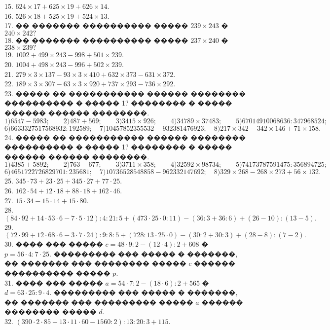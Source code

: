\documentclass[12pt]{article}
\begin{document}
15. $624\times17+625\times 19+626\times14.$\\
16. $526\times18+525\times19+524\times13.$\\
17. �� ������� ���������� ����� $239\times243$ � $240\times242?$\\
18. �� ������� ���������� ����� $237\times240$ � $238\times239?$\\
19. $1002+499\times243-998+501\times239.$\\
20. $1004+498\times243-996+502\times239.$\\
21. $279\times3\times137-93\times3\times410+632\times373-631\times372.$\\
22. $189\times3\times307-63\times3\times920+737\times293-736\times292.$\\
23. ����� �� ����������� ������ �������� ���������� � ����� 1? �������� � ����� ������ ������ ��������.\\
$1)6547-5983;\qquad 2)487+569;\qquad 3)3415\times926;\qquad 4)34789\times37483;\qquad5) 67014910068636:347968524;$
$6)6633327517568932:192589;\quad7)10457852355532-932381476923;\quad8)217\times342-342\times146+71\times158.$\\
24. ����� �� ����������� ������ �������� ���������� � ����� 1? �������� � ����� ������ ������ ��������.\\
$1)4385+5892;\qquad 2)763-677;\qquad 3)3711\times358;\qquad4)32592\times98734;\qquad5) 74173787591475:356894725;$
$6)4651722726829701:235681;\quad7)10736528548858-962332147692;\quad8)329\times268-268\times273+56\times132.$\\
25. $345\cdot73 + 23\cdot25 + 345\cdot27 + 77\cdot25.$\\
26. $162\cdot54+12\cdot18 + 88\cdot18+ 162\cdot46.$\\
27. $15\cdot34-15\cdot14+15\cdot80.$\\
28. $(84\cdot92+14\cdot53\cdot6-7\cdot5\cdot12):4:21:5+(473\cdot25\cdot0:11)-(36:3+36:6)+(26-10):(13-5).$\\
29. $(72\cdot99+12\cdot68\cdot6-3\cdot7\cdot24):9:8:5+(728:13\cdot25\cdot0)-(30:2+30:3)+(28-8):(7-2).$\\
30. ���� ��� ����� $c=48\cdot9:2-(12\cdot4):2+608$ � $p=56\cdot4:7\cdot25.$ ��������� ��� ����� � �������, �� ������� ��� �������� ����� $c$ ������ ���������� ����� $p.$\\
31. ���� ��� ����� $a=54\cdot7:2-(18\cdot6):2+565$ � $d=63\cdot25:9\cdot4.$ ��������� ��� ����� � �������, �� ������� ��� ��������� ����� $a$ ������ �������� ����� $d.$\\
32. $(390\cdot2\cdot85+13\cdot11\cdot60-1560:2):13:20:3+115.$\\
\end{document}
